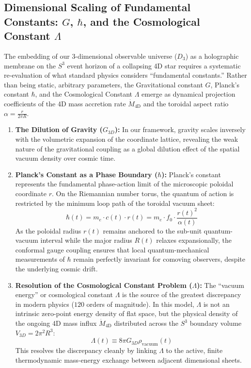 \documentclass[11pt,a4paper]{article}
\theoremstyle{plain}
\theoremstyle{definition}
\theoremstyle{remark}
\begin{document}
\subsection{Dimensional Scaling of Fundamental Constants: $G$, $\hbar$, and the Cosmological Constant $\Lambda$} 
The embedding of our 3-dimensional observable universe ($D_3$) as a holographic membrane on the $S^3$ event horizon of a collapsing 4D star requires a systematic re-evaluation of what standard physics considers ``fundamental constants.'' Rather than being static, arbitrary parameters, the Gravitational constant $G$, Planck's constant $\hbar$, and the Cosmological Constant $\Lambda$ emerge as dynamical projection coefficients of the 4D mass accretion rate $\dot{M}_{\text{4D}}$ and the toroidal aspect ratio $\alpha = \frac{r}{2\pi R}$.

\begin{enumerate} 
    \item \textbf{The Dilution of Gravity ($G_{3D}$):} In our framework, gravity scales inversely with the volumetric expansion of the coordinate lattice, revealing the weak nature of the gravitational coupling as a global dilution effect of the spatial vacuum density over cosmic time.
    \item \textbf{Planck's Constant as a Phase Boundary ($\hbar$):} Planck's constant represents the fundamental phase-action limit of the microscopic poloidal coordinate $r$. On the Riemannian number torus, the quantum of action is restricted by the minimum loop path of the toroidal vacuum sheet: 
    \begin{equation} 
    \hbar(t) = m_e \cdot c(t) \cdot r(t) = m_e \cdot f_0 \cdot \frac{r(t)^2}{\alpha(t)} 
    \end{equation} 
    As the poloidal radius $r(t)$ remains anchored to the sub-unit quantum-vacuum interval while the major radius $R(t)$ relaxes expansionally, the conformal gauge coupling ensures that local quantum-mechanical measurements of $\hbar$ remain perfectly invariant for comoving observers, despite the underlying cosmic drift.
    \item \textbf{Resolution of the Cosmological Constant Problem ($\Lambda$):} The ``vacuum energy'' or cosmological constant $\Lambda$ is the source of the greatest discrepancy in modern physics ($120$ orders of magnitude). In this model, $\Lambda$ is not an intrinsic zero-point energy density of flat space, but the physical density of the ongoing 4D mass influx $\dot{M}_{\text{4D}}$ distributed across the $S^3$ boundary volume $V_{3D} = 2\pi^2 R^3$: 
    \begin{equation} 
    \Lambda(t) \equiv 8\pi G_{3D} \rho_{\text{vacuum}}(t) 
    \end{equation}
    This resolves the discrepancy cleanly by linking $\Lambda$ to the active, finite thermodynamic mass-energy exchange between adjacent dimensional sheets.
\end{enumerate}
\end{document}
